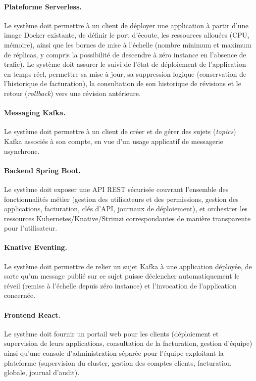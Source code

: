     \paragraph{Plateforme Serverless.} Le système doit permettre à un client de déployer une application à partir d'une image Docker existante, de définir le port d'écoute, les ressources allouées (CPU, mémoire), ainsi que les bornes de mise à l'échelle (nombre minimum et maximum de réplicas, y compris la possibilité de descendre à zéro instance en l'absence de trafic). Le système doit assurer le suivi de l'état de déploiement de l'application en temps réel, permettre sa mise à jour, sa suppression logique (conservation de l'historique de facturation), la consultation de son historique de révisions et le retour (\textit{rollback}) vers une révision antérieure.
    
    \paragraph{Messaging Kafka.} Le système doit permettre à un client de créer et de gérer des sujets (\textit{topics}) Kafka associés à son compte, en vue d'un usage applicatif de messagerie asynchrone.
    
    \paragraph{Backend Spring Boot.} Le système doit exposer une API REST sécurisée couvrant l'ensemble des fonctionnalités métier (gestion des utilisateurs et des permissions, gestion des applications, facturation, clés d'API, journaux de déploiement), et orchestrer les ressources Kubernetes/Knative/Strimzi correspondantes de manière transparente pour l'utilisateur.
    
    \paragraph{Knative Eventing.} Le système doit permettre de relier un sujet Kafka à une application déployée, de sorte qu'un message publié sur ce sujet puisse déclencher automatiquement le réveil (remise à l'échelle depuis zéro instance) et l'invocation de l'application concernée.
    
    \paragraph{Frontend React.} Le système doit fournir un portail web pour les clients (déploiement et supervision de leurs applications, consultation de la facturation, gestion d'équipe) ainsi qu'une console d'administration séparée pour l'équipe exploitant la plateforme (supervision du cluster, gestion des comptes clients, facturation globale, journal d'audit).
    
